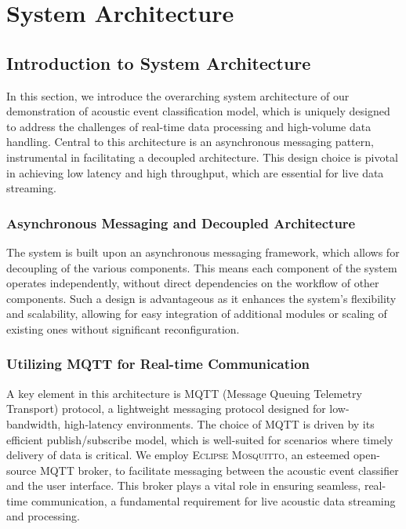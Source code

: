 \section{System Architecture}

\subsection{Introduction to System Architecture}
In this section, we introduce the overarching system architecture of our demonstration of acoustic event classification model, which is uniquely designed to address the challenges of real-time data processing and high-volume data handling. Central to this architecture is an asynchronous messaging pattern, instrumental in facilitating a decoupled architecture. This design choice is pivotal in achieving low latency and high throughput, which are essential for live data streaming.

\subsubsection{Asynchronous Messaging and Decoupled Architecture}
The system is built upon an asynchronous messaging framework, which allows for decoupling of the various components. This means each component of the system operates independently, without direct dependencies on the workflow of other components. Such a design is advantageous as it enhances the system's flexibility and scalability, allowing for easy integration of additional modules or scaling of existing ones without significant reconfiguration\cite{galvis2010messaging}.

\subsubsection{Utilizing MQTT for Real-time Communication}
A key element in this architecture is MQTT (Message Queuing Telemetry Transport) protocol, a lightweight messaging protocol designed for low-bandwidth, high-latency environments\cite{hillar2017mqtt}. The choice of MQTT is driven by its efficient publish/subscribe model, which is well-suited for scenarios where timely delivery of data is critical. We employ \textsc{Eclipse Mosquitto}, an esteemed open-source MQTT broker, to facilitate messaging between the acoustic event classifier and the user interface. This broker plays a vital role in ensuring seamless, real-time communication, a fundamental requirement for live acoustic data streaming and processing.

